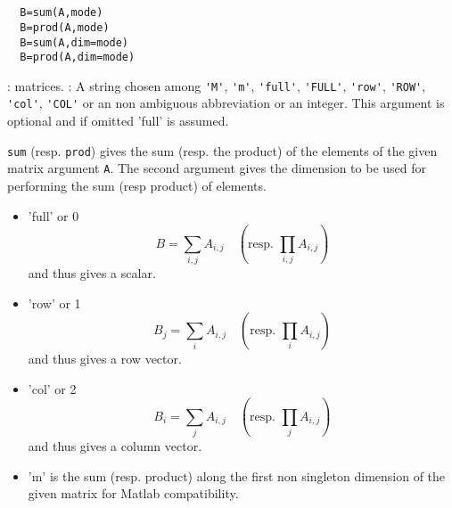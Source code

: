\begin{mandesc}
  \\ %
  \\ %
\end{mandesc}
\begin{calling_sequence}
\begin{verbatim}
  B=sum(A,mode)  
  B=prod(A,mode)  
  B=sum(A,dim=mode) 
  B=prod(A,dim=mode)  
\end{verbatim}
\end{calling_sequence}
\begin{parameters}
  \begin{varlist}
    : matrices.
    : A string chosen among \verb+'M'+, \verb+'m'+, \verb+'full'+, \verb+'FULL'+, \verb+'row'+,
    \verb+'ROW'+, \verb+'col'+, \verb+'COL'+ or an non ambiguous abbreviation or an integer. 
    This argument is optional and if omitted 'full' is assumed.
  \end{varlist}
\end{parameters}
\begin{mandescription}
  \verb+sum+ (resp. \verb+prod+) gives the sum (resp. the product) of the elements of the given matrix
  argument \verb+A+. 
  The second argument gives the dimension to be used for performing the sum (resp product) of elements.
  \begin{itemize}
    \item 'full' or 0  $$B= \sum_{i,j} A_{i,j} \quad \left(\text{resp. } \prod_{i,j} A_{i,j} \right)$$ and thus gives a scalar.
    \item 'row' or 1  $$B_j = \sum_{i} A_{i,j}\quad \left(\text{resp. } \prod_{i} A_{i,j} \right)$$ and thus gives a row vector.
    \item 'col' or 2  $$B_i = \sum_{j} A_{i,j}\quad \left(\text{resp. } \prod_{j} A_{i,j}\right)$$ and thus gives a column vector.
    \item 'm' is the sum (resp. product) along the first non singleton dimension of the given matrix 
      for Matlab compatibility. 
  \end{itemize}
\end{mandescription}
\begin{examples}
  \begin{program}
  \end{program}
\end{examples}
\begin{manseealso}
     
\end{manseealso}

